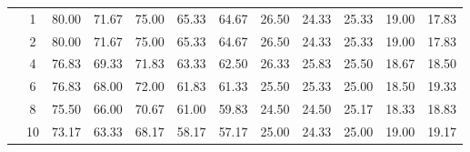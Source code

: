 \begin{table}[H]
\begin{tabular}{|c|c|c c c c c|c c c c c|}
\multicolumn{1}{|c|}{ \multirow{6}{*}{\rotatebox[origin=c]{90}{\textbf{K-vizinhos}}} }
&1	&80.00	&71.67	&75.00	&65.33	&64.67	&26.50	&24.33	&25.33	&19.00	&17.83\\\cline{2-12}
&2	&80.00	&71.67	&75.00	&65.33	&64.67	&26.50	&24.33	&25.33	&19.00	&17.83\\\cline{2-12}
&4	&76.83	&69.33	&71.83	&63.33	&62.50	&26.33	&25.83	&25.50	&18.67	&18.50\\\cline{2-12}
&6	&76.83	&68.00	&72.00	&61.83	&61.33	&25.50	&25.33	&25.00	&18.50	&19.33\\\cline{2-12}
&8	&75.50	&66.00	&70.67	&61.00	&59.83	&24.50	&24.50	&25.17	&18.33	&18.83\\\cline{2-12}
&10	&73.17	&63.33	&68.17	&58.17	&57.17	&25.00	&24.33	&25.00	&19.00	&19.17\\\midrule

	\end{tabular}
\end{table}


